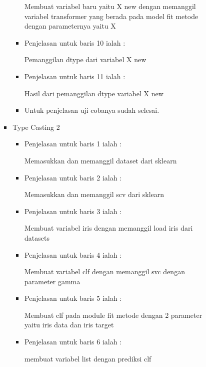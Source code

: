 \begin{itemize}
\begin{itemize}
\begin{enumerate}
\begin{itemize}
\begin{itemize}
\par Membuat variabel baru yaitu X new dengan memanggil variabel transformer yang berada pada model fit metode dengan parameternya yaitu X
\par
\item Penjelasan untuk baris 10 ialah :
\par Pemanggilan dtype dari variabel X new
\par
\item Penjelasan untuk baris 11 ialah :
\par Hasil dari pemanggilan dtype variabel X new
\par
\item Untuk penjelasan uji cobanya sudah selesai.
\par
\end{itemize}
\end{itemize}
\par
\par
\begin{itemize}
\item Type Casting 2
\par
\begin{itemize}
\item Penjelasan untuk baris 1 ialah : 
\par Memasukkan dan memanggil dataset dari sklearn
\par
\par
\item Penjelasan untuk baris 2 ialah :
\par Memasukkan dan memanggil scv dari sklearn
\par
\item Penjelasan untuk baris 3  ialah :
\par Membuat variabel iris dengan memanggil load iris dari datasets
\par
\item Penjelasan untuk baris 4  ialah :
\par Membuat variabel clf dengan memanggil svc dengan parameter gamma
\par
\item Penjelasan untuk baris 5  ialah :
\par Membuat clf pada module fit metode dengan 2 parameter yaitu iris data dan iris target
\par
\item Penjelasan untuk baris 6 ialah :
\par membuat variabel list dengan prediksi clf
\par

\end{itemize}
\end{itemize}
\end{enumerate}
\end{itemize}
\end{itemize}

